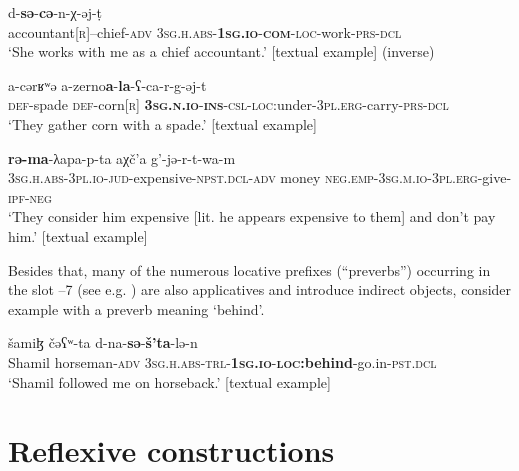 \documentclass[output=paper]{langscibook}
\begin{document}
    \ex 
    \label{ex:Arkadiev:10c}
         {d-}\textbf{{s{ə}}}{{}-}\textbf{{c{ə}}}{{}-n-χ-{ə}j-t{̣}}\\
    accountant[\textsc{r}]–chief-\textsc{adv}  \textsc{3sg.h.abs-}\textbf{\textsc{1sg.io}}\textsc{{}-}\textbf{\textsc{com}}\textsc{{}-loc}{}-work-\textsc{prs-dcl}\\
    \glt ‘She works with me as a chief accountant.’ [textual example] (inverse)
    
    \ex 
    \label{ex:Arkadiev:10d}
    \gll  a-c{ə}r{ʁ}{ʷ}{ə}  a-zerno\textbf  {a}{-}\textbf{la}{}-{ʕ}-ca-r-g-{ə}j-t\\
    \textsc{def}-spade \textsc{def}-corn[\textsc{r}] \textbf{\textsc{3sg.n.io}}\textsc{{}-}\textbf{\textsc{ins}}\textsc{{}-csl-loc}:under-\textsc{3pl.erg}{}-carry-\textsc{prs-dcl}\\
    \glt ‘They gather corn with a spade.’ [textual example]
    
    \ex 
    \label{ex:Arkadiev:10e}
    \textbf{{r{ə}-ma}}{{}-λapa-p-ta}  {aχč’a} {g’-j{ə}-r-t-wa-m}\\
   \textsc{3sg.h.abs-3pl.io-jud}{}-expensive\textsc{{}-npst.dcl-adv} money  \textsc{neg.emp-3sg.m.io-3pl.erg}{}-give-\textsc{ipf-neg}\\
    \glt ‘They consider him expensive [lit. he appears expensive to them] and don’t pay him.’ [textual example]
    \z
\z


Besides that, many of the numerous locative prefixes (“preverbs”) occurring in the slot –7 (see e.g. \citealt{Klychev1995}) are also applicatives and introduce indirect objects, consider example  with a preverb meaning ‘behind’.


\ea 
\label{ex:Arkadiev:11}
    \gll šami{ɮ}    č{ə}{ʕ}{ʷ}-ta  d-na-\textbf{{s{ə}}}{{}-}\textbf{š’ta}-l{ə}-n\\
  Shamil  horseman-\textsc{adv}  \textsc{3sg.h.abs-trl-}\textbf{\textsc{1sg.io}}\textsc{{}-}\textbf{\textsc{loc}}\textbf{:behind}{}-go.in-\textsc{pst.dcl}\\
    \glt ‘Shamil followed me on horseback.’ [textual example]
\z
 



\section{Reflexive constructions}\label{sec:Arkadiev:2}
\end{document}
